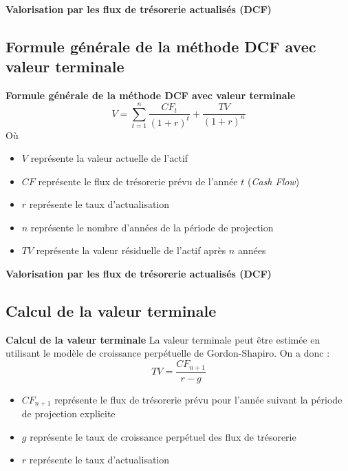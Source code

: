 \documentclass{beamer}
\begin{document}
\begin{frame}{\textbf{Valorisation par les flux de trésorerie actualisés (DCF)}}
\subsection{Formule générale de la méthode DCF avec valeur terminale}
\begin{alertblock}{\textbf{Formule générale de la méthode DCF avec valeur terminale}}
\[ V = \sum_{t=1}^n \frac{CF_t}{(1+r)^t}+\frac{TV}{(1+r)^n}\]
Où
\begin{itemize}
	\item \( V \) représente la valeur actuelle de l'actif
	\item \( CF \) représente le flux de trésorerie prévu de l'année \( t \) (\textit{Cash Flow})
	\item \( r \) représente le taux  d'actualisation
	\item \( n \) représente le nombre d'années de la période de projection
	\item \( TV \) représente la valeur résiduelle de l'actif après \( n \) années
\end{itemize}
\end{alertblock}
\end{frame}

\begin{frame}{\textbf{Valorisation par les flux de trésorerie actualisés (DCF)}}
\subsection{Calcul de la valeur terminale}
\begin{alertblock}{\textbf{Calcul de la valeur terminale}}
La valeur terminale peut être estimée en utilisant le modèle de croissance perpétuelle de Gordon-Shapiro. On a donc :
\[ TV = \frac{CF_{n+1}}{r-g} \]
	
\begin{itemize}
	\item \( CF_{n+1} \) représente le flux de trésorerie prévu pour l'année suivant la période de projection explicite
	\item \( g \) représente le taux de croissance perpétuel des flux de trésorerie
	\item \( r \) représente le taux  d'actualisation
\end{itemize}
\end{alertblock}	
	
\end{frame}
\end{document}
